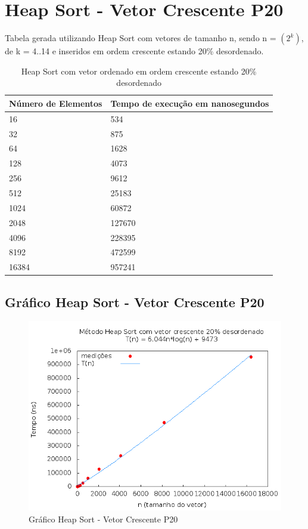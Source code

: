 \documentclass[12pt,a4paper,twoside]{report}
\begin{document}
\section{Heap Sort - Vetor Crescente P20}
Tabela gerada utilizando Heap Sort com vetores de tamanho n, sendo n = $(2^k)$, de k = 4..14 e inseridos em ordem crescente estando 20\% desordenado.
\begin{table}[H]
\centering
\caption{Heap Sort com vetor ordenado em ordem crescente estando 20\% desordenado}
\label{my-label}
\begin{tabular}{|l|l|}
\hline
\multicolumn{1}{|c|}{\textbf{Número de Elementos}} & \multicolumn{1}{c|}{\textbf{Tempo de execução em nanosegundos}} \\ \hline
16 & 534 \\ \hline
32 & 875 \\ \hline
64 & 1628 \\ \hline
128 & 4073 \\ \hline
256 & 9612 \\ \hline
512 & 25183 \\ \hline
1024 & 60872 \\ \hline
2048 & 127670 \\ \hline
4096 & 228395 \\ \hline
8192 & 472599 \\ \hline
16384 & 957241 \\ \hline
\end{tabular}
\end{table}

\subsection{Gráfico Heap Sort - Vetor Crescente P20}
\begin{figure}[H]
    \centering
    \includegraphics[width=0.7\linewidth]{graficos/HeapSort/vIntCrescenteP20/vIntCrescenteP20.png}
  \caption{Gráfico Heap Sort - Vetor Crescente P20}
\end{figure}
\end{document}
